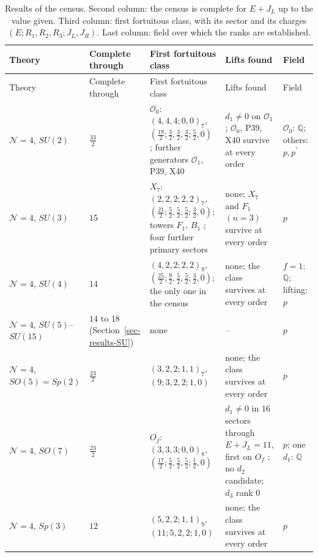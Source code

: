 \documentclass[11pt]{article}
\numberwithin{equation}{section}
\numberwithin{figure}{section}
\numberwithin{table}{section}
\begin{document}
{\footnotesize\renewcommand{\arraystretch}{1.3}\setlength{\tabcolsep}{3.5pt}
\begin{xltabular}{\linewidth}{|>{\raggedright\arraybackslash}p{2.3cm}|>{\raggedright\arraybackslash}p{2.2cm}|>{\raggedright\arraybackslash}X|>{\raggedright\arraybackslash}X|>{\raggedright\arraybackslash}p{1.75cm}|}
\caption{Results of the census. Second column: the census is complete for $E+J_L$ up to the value given. Third column: first fortuitous class, with its sector and its charges $(E;R_1,R_2,R_3;J_L,J_R)$. Last column: field over which the ranks are established.}\label{tab-census-overview}\\
\hline
Theory & Complete through & First fortuitous class & Lifts found & Field\\
\hline\endfirsthead
\hline
Theory & Complete through & First fortuitous class & Lifts found & Field\\
\hline\endhead
$\mathcal N=4$, $SU(2)$ & $\tfrac{33}2$ & $\mathcal O_0$: $(4,4,4;0,0)_7$, $(\tfrac{19}2;\tfrac32,\tfrac32,\tfrac32;\tfrac52,0)$ \cite{KKLP,ChangLinWords}; further generators $\mathcal O_1$, P39, X40 & $d_1\ne0$ on $\mathcal O_1$ \cite{KKLP}; $\mathcal O_0$, P39, X40 survive at every order & $\mathcal O_0$: $\mathbb Q$; others: $p,p^{\prime}$\\
\hline
$\mathcal N=4$, $SU(3)$ & $15$ & $X_7$: $(2,2,2;2,2)_7$, $(\tfrac{21}2;\tfrac52,\tfrac52,\tfrac52;\tfrac32,0)$; towers $F_1$, $B_1$ \cite{KLLS,BraneFused}; four further primary sectors & none; $X_7$ and $F_1$ $(n=3)$ survive at every order & $p$\\
\hline
$\mathcal N=4$, $SU(4)$ & $14$ & $(4,2,2;2,2)_9$, $(\tfrac{25}2;\tfrac92,\tfrac52,\tfrac52;\tfrac32,0)$; the only one in the census & none; the class survives at every order & $f=1$: $\mathbb Q$; lifting: $p$\\
\hline
$\mathcal N=4$, $SU(5)$--$SU(15)$ & $14$ to $18$ (Section~\ref{sec-results-SU}) & none & -- & $p$\\
\hline
$\mathcal N=4$, $SO(5)=Sp(2)$ & $\tfrac{23}2$ & $(3,2,2;1,1)_7$, $(9;3,2,2;1,0)$ & none; the class survives at every order & $p$\\
\hline
$\mathcal N=4$, $SO(7)$ & $\tfrac{23}2$ & $O_f$: $(3,3,3;0,0)_8$, $(\tfrac{17}2;\tfrac52,\tfrac52,\tfrac52;\tfrac12,0)$ \cite{GLRT} & $d_1\ne0$ in $16$ sectors through $E+J_L=11$, first on $O_f$ \cite{KonishiBH}; no $d_2$ candidate; $d_3$ rank $0$ & $p$; one $d_1$: $\mathbb Q$\\
\hline
$\mathcal N=4$, $Sp(3)$ & $12$ & $(5,2,2;1,1)_9$, $(11;5,2,2;1,0)$ & none; the class survives at every order & $p$\\

\end{xltabular}}
\end{document}
